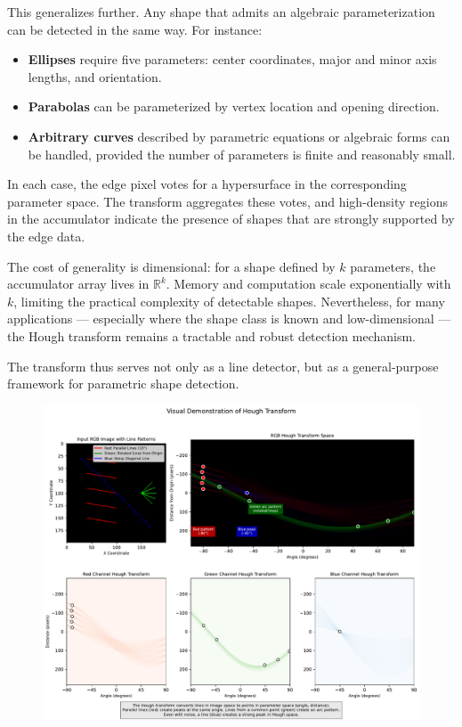 This generalizes further. Any shape that admits an algebraic parameterization can be detected in the same way. For instance:

\begin{itemize}
  \item \textbf{Ellipses} require five parameters: center coordinates, major and minor axis lengths, and orientation.
  \item \textbf{Parabolas} can be parameterized by vertex location and opening direction.
  \item \textbf{Arbitrary curves} described by parametric equations or algebraic forms can be handled, provided the number of parameters is finite and reasonably small.
\end{itemize}

In each case, the edge pixel votes for a hypersurface in the corresponding parameter space. The transform aggregates these votes, and high-density regions in the accumulator indicate the presence of shapes that are strongly supported by the edge data.

The cost of generality is dimensional: for a shape defined by $k$ parameters, the accumulator array lives in $\mathbb{R}^k$. Memory and computation scale exponentially with $k$, limiting the practical complexity of detectable shapes. Nevertheless, for many applications — especially where the shape class is known and low-dimensional — the Hough transform remains a tractable and robust detection mechanism.

The transform thus serves not only as a line detector, but as a general-purpose framework for parametric shape detection.


\begin{figure}[ht]
  \centering
  \includegraphics[width=1\textwidth]{41_HoughTransfrom/hough_transform_visualization.pdf}
  \label{fig:permgraph3}
\end{figure}